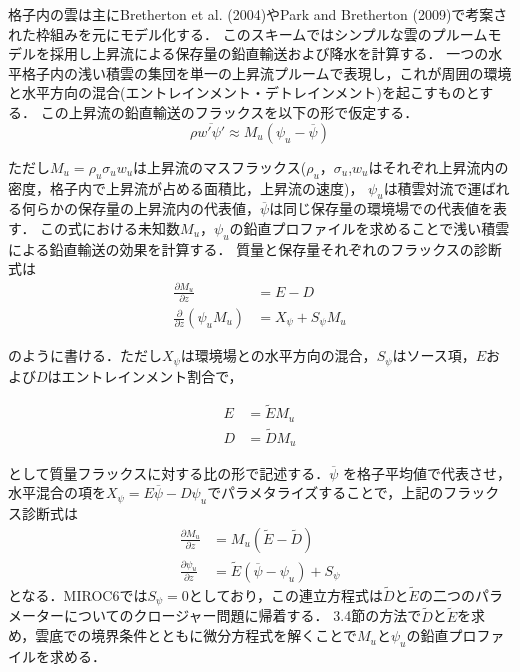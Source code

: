 \documentclass[platex, dvipdfmx]{jsarticle}
\begin{document}
格子内の雲は主にBretherton et al. (2004)やPark and Bretherton (2009)で考案された枠組みを元にモデル化する．
このスキームではシンプルな雲のプルームモデルを採用し上昇流による保存量の鉛直輸送および降水を計算する．
一つの水平格子内の浅い積雲の集団を単一の上昇流プルームで表現し，これが周囲の環境と水平方向の混合(エントレインメント・デトレインメント)を起こすものとする．
この上昇流の鉛直輸送のフラックスを以下の形で仮定する．
\begin{equation}
    \rho \overline {w' \psi '}\approx M_u (\psi_u-\overline{\psi}) 
\end{equation}

ただし$M_u=\rho_u\sigma_u w_u$は上昇流のマスフラックス($\rho_u$，$\sigma_u$,$w_u$はそれぞれ上昇流内の密度，格子内で上昇流が占める面積比，上昇流の速度)，
$\psi_u$は積雲対流で運ばれる何らかの保存量の上昇流内の代表値，$\overline{\psi}$は同じ保存量の環境場での代表値を表す．
この式における未知数$M_u$，$\psi_u$の鉛直プロファイルを求めることで浅い積雲による鉛直輸送の効果を計算する．
質量と保存量それぞれのフラックスの診断式は
\begin{align}
    \frac{\partial M_u}{\partial z} &= E - D \\
    \frac{\partial}{\partial z} (\psi_u M_u) &= X_\psi + S_\psi M_u
\end{align}

のように書ける．ただし$X_\psi$は環境場との水平方向の混合，$S_\psi$はソース項，$E$および$D$はエントレインメント割合で，

\begin{align}
    E &=\tilde{E}M_u \\
    D &=\tilde{D} M_u
\end{align}

として質量フラックスに対する比の形で記述する．$\overline{\psi}$ を格子平均値で代表させ，
水平混合の項を$X_{\psi}=E \overline{\psi} - D\psi_u$でパラメタライズすることで，上記のフラックス診断式は
\begin{align}
    \frac{\partial M_u}{\partial z} &= M_u (\tilde{E} - \tilde{D}) \\
    \frac{\partial \psi_u}{\partial z} &= \tilde{E}(\overline{\psi} - \psi_u) + S_{\psi}
\end{align}
となる．MIROC6では$S_{\psi}=0$としており，この連立方程式は$\tilde{D}$と$\tilde{E}$の二つのパラメーターについてのクロージャー問題に帰着する．
3.4節の方法で$\tilde{D}$と$\tilde{E}$を求め，雲底での境界条件とともに微分方程式を解くことで$M_u$と$\psi_u$の鉛直プロファイルを求める．

\end{document}
